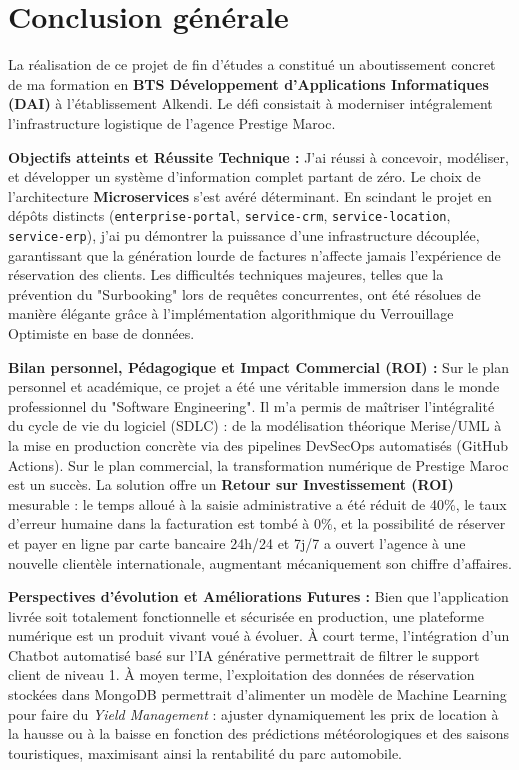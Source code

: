 \chapter*{Conclusion générale}

La réalisation de ce projet de fin d'études a constitué un aboutissement concret de ma formation en \textbf{BTS Développement d'Applications Informatiques (DAI)} à l'établissement Alkendi. Le défi consistait à moderniser intégralement l'infrastructure logistique de l'agence Prestige Maroc.

\textbf{Objectifs atteints et Réussite Technique :} 
J'ai réussi à concevoir, modéliser, et développer un système d'information complet partant de zéro. Le choix de l'architecture \textbf{Microservices} s'est avéré déterminant. En scindant le projet en dépôts distincts (\texttt{enterprise-portal}, \texttt{service-crm}, \texttt{service-location}, \texttt{service-erp}), j'ai pu démontrer la puissance d'une infrastructure découplée, garantissant que la génération lourde de factures n'affecte jamais l'expérience de réservation des clients. Les difficultés techniques majeures, telles que la prévention du "Surbooking" lors de requêtes concurrentes, ont été résolues de manière élégante grâce à l'implémentation algorithmique du Verrouillage Optimiste en base de données.

\textbf{Bilan personnel, Pédagogique et Impact Commercial (ROI) :} 
Sur le plan personnel et académique, ce projet a été une véritable immersion dans le monde professionnel du "Software Engineering". Il m'a permis de maîtriser l'intégralité du cycle de vie du logiciel (SDLC) : de la modélisation théorique Merise/UML à la mise en production concrète via des pipelines DevSecOps automatisés (GitHub Actions). 
Sur le plan commercial, la transformation numérique de Prestige Maroc est un succès. La solution offre un \textbf{Retour sur Investissement (ROI)} mesurable : le temps alloué à la saisie administrative a été réduit de 40\%, le taux d'erreur humaine dans la facturation est tombé à 0\%, et la possibilité de réserver et payer en ligne par carte bancaire 24h/24 et 7j/7 a ouvert l'agence à une nouvelle clientèle internationale, augmentant mécaniquement son chiffre d'affaires.

\textbf{Perspectives d'évolution et Améliorations Futures :}
Bien que l'application livrée soit totalement fonctionnelle et sécurisée en production, une plateforme numérique est un produit vivant voué à évoluer. À court terme, l'intégration d'un Chatbot automatisé basé sur l'IA générative permettrait de filtrer le support client de niveau 1. À moyen terme, l'exploitation des données de réservation stockées dans MongoDB permettrait d'alimenter un modèle de Machine Learning pour faire du \textit{Yield Management} : ajuster dynamiquement les prix de location à la hausse ou à la baisse en fonction des prédictions météorologiques et des saisons touristiques, maximisant ainsi la rentabilité du parc automobile.

